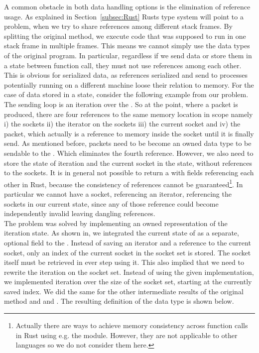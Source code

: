 A common obstacle in both data handling options is the elimination of reference usage. As explained in Section~\ref{subsec:Rust} Rusts type system will point to a problem, when we try to share references among different stack frames. By splitting the original  method, we execute code that was supposed to run in one stack frame in multiple frames. This means we cannot simply use the data types of the original program. In particular, regardless if we send data or store them in a state between function call, they must not use references among each other. This is obvious for serialized data, as references serialized and send to processes potentially running on a different machine loose their relation to memory. For the case of data stored in a state, consider the following example from our problem. The sending loop is an iteration over the . So at the point, where a packet is produced, there are four references to the same memory location in scope namely i) the sockets ii) the iterator on the sockets iii) the current socket and iv) the packet, which actually is a reference to memory inside the socket until it is finally send. As mentioned before, packets need to be become an owned data type to be sendable to the \dev{}. Which eliminates the fourth reference. However, we also need to store the state of iteration and the current socket in the state, without references to the sockets. It is in general not possible to return a  with fields referencing each other in Rust, because the consistency of references cannot be guaranteed\footnote{Actually there are ways to achieve memory consistency across function calls in Rust using e.g. the  module. However, they are not applicable to other languages so we do not consider them here.}. In particular we cannot have a socket, referencing an iterator, referencing the sockets in our current state, since any of those reference could become independently invalid leaving dangling references. \\

The problem was solved by implementing an owned representation of the iteration state. As shown in, we integrated the current state of  as a separate, optional field to the \stack{}. Instead of saving an iterator and a reference to the current socket, only an index of the current socket in the socket set is stored. The socket itself must be retrieved in ever step using it. This also implied that we need to rewrite the iteration on the socket set. Instead of using the given  implementation, we implemented iteration over the size of the socket set, starting at the currently saved index. We did the same for the other intermediate results of the original method  and  and . The resulting definition of the \stack{} data type is shown below. 

